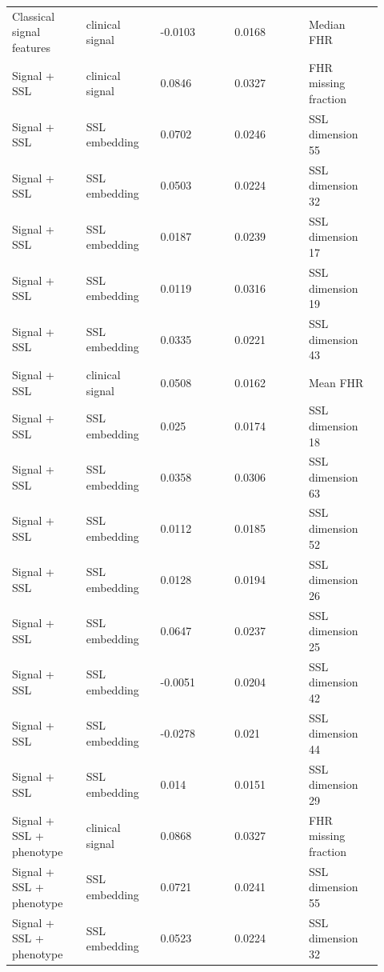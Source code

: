 \documentclass[utf8]{frontiers_suppmat}
\begin{document}
\begin{landscape}
\begin{longtable}{L{0.184\linewidth} L{0.184\linewidth} L{0.184\linewidth} L{0.184\linewidth} L{0.184\linewidth}}
Classical signal features & clinical signal & -\allowbreak{}0.\allowbreak{}0103 & 0.\allowbreak{}0168 & Median FHR \\
Signal + SSL & clinical signal & 0.\allowbreak{}0846 & 0.\allowbreak{}0327 & FHR missing fraction \\
Signal + SSL & SSL embedding & 0.\allowbreak{}0702 & 0.\allowbreak{}0246 & SSL dimension 55 \\
Signal + SSL & SSL embedding & 0.\allowbreak{}0503 & 0.\allowbreak{}0224 & SSL dimension 32 \\
Signal + SSL & SSL embedding & 0.\allowbreak{}0187 & 0.\allowbreak{}0239 & SSL dimension 17 \\
Signal + SSL & SSL embedding & 0.\allowbreak{}0119 & 0.\allowbreak{}0316 & SSL dimension 19 \\
Signal + SSL & SSL embedding & 0.\allowbreak{}0335 & 0.\allowbreak{}0221 & SSL dimension 43 \\
Signal + SSL & clinical signal & 0.\allowbreak{}0508 & 0.\allowbreak{}0162 & Mean FHR \\
Signal + SSL & SSL embedding & 0.\allowbreak{}025 & 0.\allowbreak{}0174 & SSL dimension 18 \\
Signal + SSL & SSL embedding & 0.\allowbreak{}0358 & 0.\allowbreak{}0306 & SSL dimension 63 \\
Signal + SSL & SSL embedding & 0.\allowbreak{}0112 & 0.\allowbreak{}0185 & SSL dimension 52 \\
Signal + SSL & SSL embedding & 0.\allowbreak{}0128 & 0.\allowbreak{}0194 & SSL dimension 26 \\
Signal + SSL & SSL embedding & 0.\allowbreak{}0647 & 0.\allowbreak{}0237 & SSL dimension 25 \\
Signal + SSL & SSL embedding & -\allowbreak{}0.\allowbreak{}0051 & 0.\allowbreak{}0204 & SSL dimension 42 \\
Signal + SSL & SSL embedding & -\allowbreak{}0.\allowbreak{}0278 & 0.\allowbreak{}021 & SSL dimension 44 \\
Signal + SSL & SSL embedding & 0.\allowbreak{}014 & 0.\allowbreak{}0151 & SSL dimension 29 \\
Signal + SSL + phenotype & clinical signal & 0.\allowbreak{}0868 & 0.\allowbreak{}0327 & FHR missing fraction \\
Signal + SSL + phenotype & SSL embedding & 0.\allowbreak{}0721 & 0.\allowbreak{}0241 & SSL dimension 55 \\
Signal + SSL + phenotype & SSL embedding & 0.\allowbreak{}0523 & 0.\allowbreak{}0224 & SSL dimension 32 \\

\end{longtable}
\end{landscape}
\end{document}
